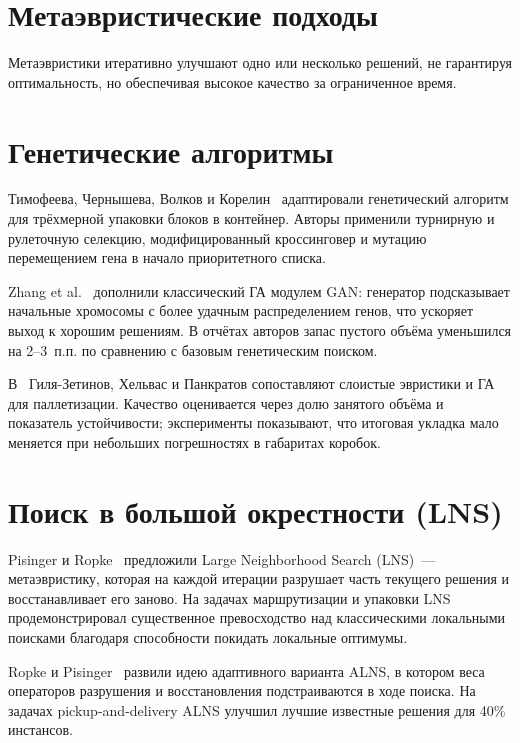 \section{Метаэвристические подходы}

Метаэвристики итеративно улучшают одно или несколько решений, не гарантируя оптимальность, но обеспечивая высокое качество за ограниченное время.

\section{Генетические алгоритмы}

Тимофеева, Чернышева, Волков и Корелин~\cite{korelin} адаптировали генетический алгоритм для трёхмерной упаковки блоков в контейнер. Авторы применили турнирную и рулеточную селекцию, модифицированный кроссинговер и мутацию перемещением гена в начало приоритетного списка.

Zhang et al.~\cite{Zhang2024} дополнили классический ГА модулем GAN: генератор подсказывает начальные хромосомы с более удачным распределением генов, что ускоряет выход к хорошим решениям. В отчётах авторов запас пустого объёма уменьшился на 2--3~п.п. по сравнению с базовым генетическим поиском.

В~\cite{TR-MFTI-khelvas2019-boxes, khel-EnT2019} Гиля-Зетинов, Хельвас и Панкратов сопоставляют слоистые эвристики и ГА для паллетизации. Качество оценивается через долю занятого объёма и показатель устойчивости; эксперименты показывают, что итоговая укладка мало меняется при небольших погрешностях в габаритах коробок.

\section{Поиск в большой окрестности (LNS)}

Pisinger и Ropke~\cite{Pisinger2005} предложили Large Neighborhood Search (LNS)~--- метаэвристику, которая на каждой итерации разрушает часть текущего решения и восстанавливает его заново. На задачах маршрутизации и упаковки LNS продемонстрировал существенное превосходство над классическими локальными поисками благодаря способности покидать локальные оптимумы.

Ropke и Pisinger~\cite{Ropke2006} развили идею адаптивного варианта ALNS, в котором веса операторов разрушения и восстановления подстраиваются в ходе поиска. На задачах pickup-and-delivery ALNS улучшил лучшие известные решения для 40\% инстансов.

